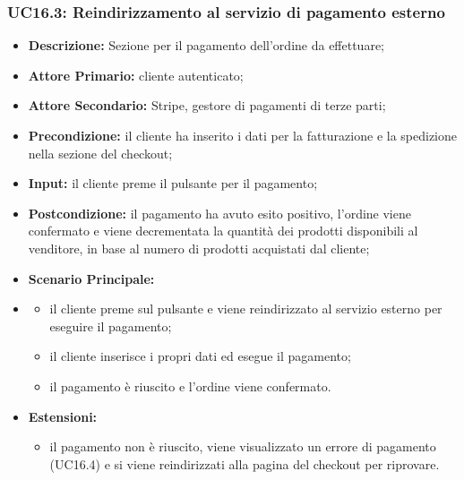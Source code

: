             \subsubsection{UC16.3: Reindirizzamento al servizio di pagamento esterno}
                \begin{itemize}
                    \item \textbf{Descrizione:} Sezione per il pagamento dell'ordine da effettuare;
                    \item \textbf{Attore Primario:} cliente autenticato;
                    \item \textbf{Attore Secondario:} Stripe, gestore di pagamenti di terze parti;
                    \item \textbf{Precondizione:} il cliente ha inserito i dati per la fatturazione e la spedizione nella sezione del checkout;
                    \item \textbf{Input:} il cliente preme il pulsante per il pagamento;
                    \item \textbf{Postcondizione:} il pagamento ha avuto esito positivo, l'ordine viene confermato e viene decrementata la quantità dei prodotti disponibili al venditore, in base al numero di prodotti acquistati dal cliente;
                    \item \textbf{Scenario Principale:}
                    \item \begin{itemize}
                        \item il cliente preme sul pulsante e viene reindirizzato al servizio esterno per eseguire il pagamento;
                        \item il cliente inserisce i propri dati ed esegue il pagamento;
                        \item il pagamento è riuscito e l'ordine viene confermato.
                    \end{itemize}
                    \item \textbf{Estensioni:}
                    \begin{itemize}
                        \item il pagamento non è riuscito, viene visualizzato un errore di pagamento (UC16.4) e si viene reindirizzati alla pagina del checkout per riprovare.
                    \end{itemize}
                \end{itemize}
